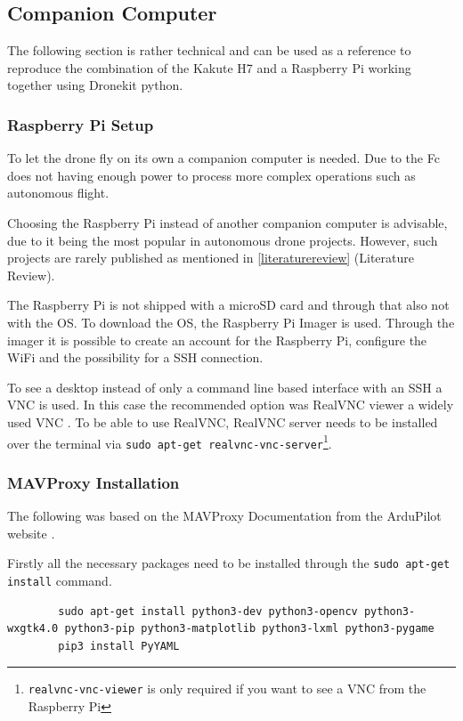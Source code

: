 \documentclass[svgnames]{article}
\begin{document}
	\subsection{Companion Computer}\label{companion computer}
	The following section is rather technical and can be used as a reference to reproduce the combination of the Kakute H7 and a Raspberry Pi working together using Dronekit python.
	\newpage
	\subsubsection{Raspberry Pi Setup}
	
	To let the drone fly on its own a companion computer is needed. Due to the \gls{Fc} does not having enough power to process more complex operations such as autonomous flight.
	
	Choosing the Raspberry Pi instead of another companion computer is advisable, due to it being the most popular in autonomous drone projects. However, such projects are rarely published as mentioned in \cref{literaturereview} (Literature Review).
	
	The Raspberry Pi is not shipped with a microSD card and through that also not with the \gls{OS}. To download the \gls{OS}, the Raspberry Pi Imager is used. Through the imager it is possible to create an account for the Raspberry Pi,  configure the WiFi and the possibility for a \gls{SSH} connection. 

	
	To see a desktop instead of only a command line based interface with an \gls{SSH} a \gls{VNC} is used. In this case the recommended option was RealVNC viewer a widely used \gls{VNC} \cite{ionisvnctutorial}. To be able to use RealVNC, RealVNC server needs to be installed over the terminal via \lstinline|sudo apt-get realvnc-vnc-server|\footnote{\lstinline|realvnc-vnc-viewer| is only required if you want to see a VNC from the Raspberry Pi}.
	
	\subsubsection{MAVProxy Installation}
	The following was based on the MAVProxy Documentation from the ArduPilot website  \cite{MavProxydocs}.
	
	Firstly all the necessary packages need to be installed through the \lstinline|sudo apt-get install| command. 
	\begin{lstlisting}
		sudo apt-get install python3-dev python3-opencv python3-wxgtk4.0 python3-pip python3-matplotlib python3-lxml python3-pygame
		pip3 install PyYAML
	\end{lstlisting}
\end{document}
